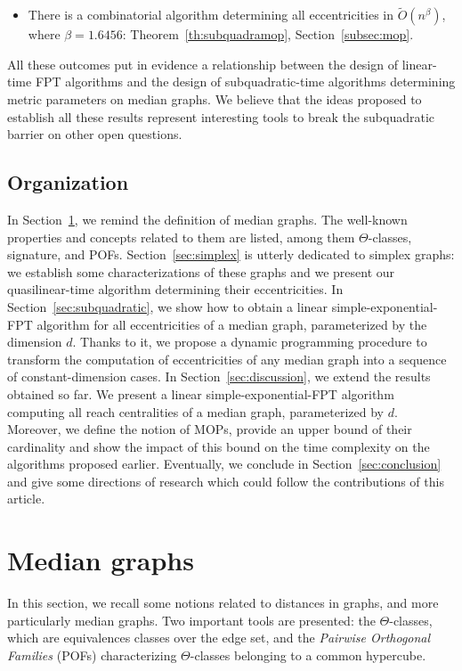 \documentclass{article}
\begin{document}
\begin{itemize}
    \item There is a combinatorial algorithm determining all eccentricities in $\tilde{O}(n^{\beta})$, where $\beta = 1.6456$: Theorem~\ref{th:subquadramop}, Section~\ref{subsec:mop}.
\end{itemize}

All these outcomes put in evidence a relationship between the design of linear-time FPT algorithms and the design of subquadratic-time algorithms determining metric parameters on median graphs. We believe that the ideas proposed to establish all these results represent interesting tools to break the subquadratic barrier on other open questions.

\subsection{Organization}

In Section~\ref{sec:median}, we remind the definition of median graphs. The well-known properties and concepts related to them are listed, among them $\Theta$-classes, signature, and POFs. Section~\ref{sec:simplex} is utterly dedicated to simplex graphs: we establish some characterizations of these graphs and we present our quasilinear-time algorithm determining their eccentricities. In Section~\ref{sec:subquadratic}, we show how to obtain a linear simple-exponential-FPT algorithm for all eccentricities of a median graph, parameterized by the dimension $d$. Thanks to it, we propose a dynamic programming procedure to transform the computation of eccentricities of any median graph into a sequence of constant-dimension cases. In Section~\ref{sec:discussion}, we extend the results obtained so far. We present a linear simple-exponential-FPT algorithm computing all reach centralities of a median graph, parameterized by $d$. Moreover, we define the notion of MOPs, provide an upper bound of their cardinality and show the impact of this bound on the time complexity on the algorithms proposed earlier. Eventually, we conclude in Section~\ref{sec:conclusion} and give some directions of research which could follow the contributions of this article.

\section{Median graphs} \label{sec:median}

In this section, we recall some notions related to distances in graphs, and more particularly median graphs. Two important tools are presented: the $\Theta$-classes, which are equivalences classes over the edge set, and the \textit{Pairwise Orthogonal Families} (POFs) characterizing $\Theta$-classes belonging to a common hypercube. 
\end{document}
